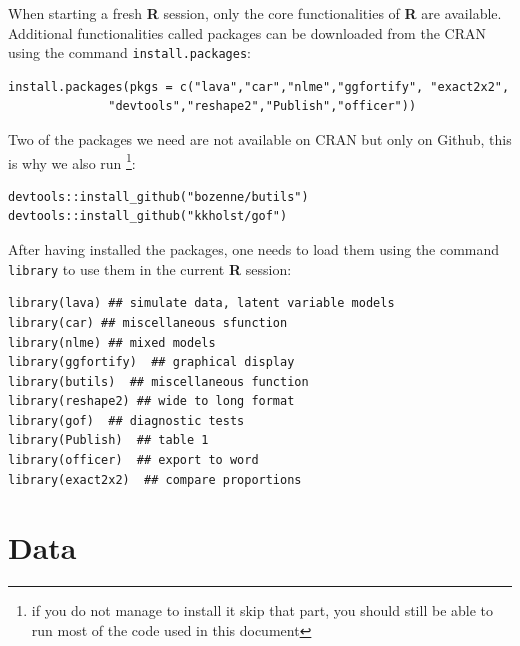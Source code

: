 \documentclass[12pt]{article}
\newcommand\Rlogo{\textbf{\textsf{R}}\xspace} %
\begin{document}
When starting a fresh \Rlogo{} session, only the core functionalities
of \Rlogo{} are available. Additional functionalities called packages
can be downloaded from the CRAN using the command \texttt{install.packages}:
\lstset{language=r,label= ,caption= ,captionpos=b,numbers=none}
\begin{lstlisting}
install.packages(pkgs = c("lava","car","nlme","ggfortify", "exact2x2",
			  "devtools","reshape2","Publish","officer"))
\end{lstlisting}
Two of the packages we need are not available on CRAN but only on
Github, this is why we also run \footnote{if you do not manage to install
it skip that part, you should still be able to run most of the code
used in this document}:
\lstset{language=r,label= ,caption= ,captionpos=b,numbers=none}
\begin{lstlisting}
devtools::install_github("bozenne/butils")
devtools::install_github("kkholst/gof")
\end{lstlisting}
After having installed the packages, one needs to load them using the
command \texttt{library} to use them in the current \Rlogo{} session:
\lstset{language=r,label= ,caption= ,captionpos=b,numbers=none}
\begin{lstlisting}
library(lava) ## simulate data, latent variable models
library(car) ## miscellaneous sfunction
library(nlme) ## mixed models
library(ggfortify)  ## graphical display
library(butils)  ## miscellaneous function
library(reshape2) ## wide to long format
library(gof)  ## diagnostic tests
library(Publish)  ## table 1
library(officer)  ## export to word
library(exact2x2)  ## compare proportions
\end{lstlisting}

\clearpage

\section{Data}
\label{sec:Data}
\end{document}
